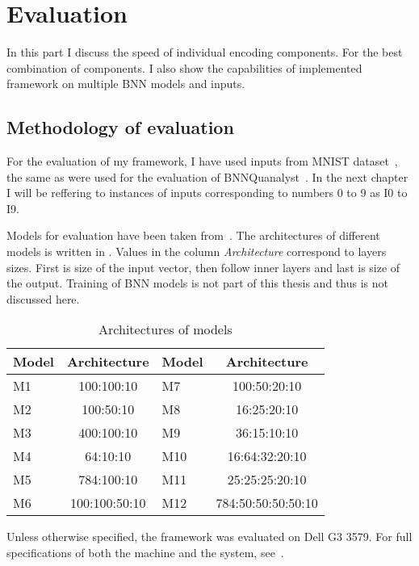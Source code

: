 \chapter{Evaluation}

In this part I discuss the speed of individual encoding components.
For the best combination of components. I also show the capabilities
of implemented framework on multiple BNN models and inputs.

\section{Methodology of evaluation}

For the evaluation of my framework, I have used inputs from MNIST dataset~\cite{mnist2017},
the same as were used for the evaluation of BNNQuanalyst~\cite{10.1145/3563212}.
In the next chapter I will be reffering to instances of inputs corresponding to
numbers 0 to 9 as I0 to I9.

Models for evaluation have been taken from~\cite{10.1145/3563212}.
The architectures of different models is written in .
Values in the column \textit{Architecture} correspond to layers sizes. First is
size of the input vector, then follow inner layers and last is size of the output.
Training of BNN models is not part of this thesis and thus is not discussed here.

\begin{table}[H]
\begin{tabular}{l c | l c}  %
    \toprule{}%
    Model & Architecture  & Model & Architecture       \\ \midrule
    M1    & 100:100:10    & M7    & 100:50:20:10       \\
    M2    & 100:50:10     & M8    & 16:25:20:10        \\
    M3    & 400:100:10    & M9    & 36:15:10:10        \\
    M4    & 64:10:10      & M10   & 16:64:32:20:10     \\
    M5    & 784:100:10    & M11   & 25:25:25:20:10     \\
    M6    & 100:100:50:10 & M12   & 784:50:50:50:50:10 \\ \bottomrule
\end{tabular}
\caption{Architectures of models}%
    \label{table:model_architecture}
\end{table}

Unless otherwise specified, the framework was evaluated on Dell G3 3579.
For full specifications of both the machine and the system, see~.


